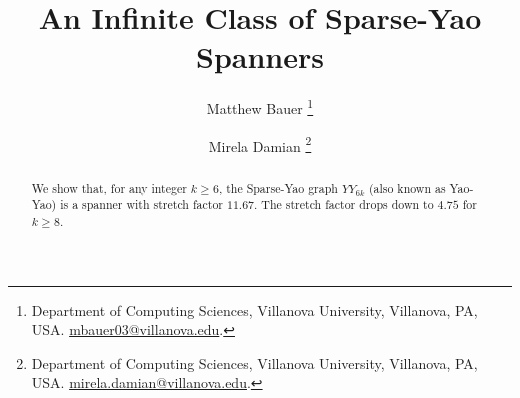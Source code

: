 \documentclass[11pt]{article}
\begin{document}
\title{An Infinite Class of Sparse-Yao Spanners}
\author{Matthew Bauer
    \thanks{ Department of Computing Sciences, Villanova University, Villanova, PA, USA. \protect\url{mbauer03@villanova.edu}.}
\and
Mirela Damian
    \thanks{ Department of Computing Sciences, Villanova University, Villanova, PA, USA. \protect\url{mirela.damian@villanova.edu}.}
}

\date{}

\maketitle

\begin{abstract}
We show that, for any integer $k \ge 6$, the Sparse-Yao graph $YY_{6k}$ (also known as Yao-Yao) is a spanner with stretch factor $11.67$. The stretch factor drops down to $4.75$ for $k \ge 8$.
\end{abstract}
\end{document}

